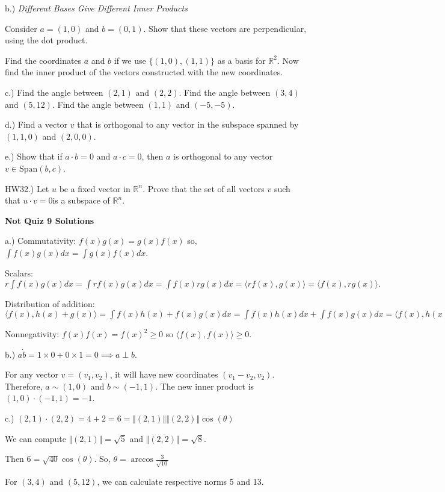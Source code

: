 \documentclass{article}
\begin{document}
b.) \emph{Different Bases Give Different Inner Products}

Consider $a=(1,0)$ and $b=(0,1)$. Show that these vectors are perpendicular, using the dot product. 


Find the coordinates $a$ and $b$ if we use $\{(1,0),(1,1)\}$ as a basis for $\mathbb{R}^2$. Now find the inner product of the vectors constructed with the new coordinates. 

c.) Find the angle between $(2,1)$ and $(2,2)$. Find the angle between $(3,4)$ and $(5,12)$. Find the angle between $(1,1)$ and $(-5,-5)$. 

d.) Find a vector $v$ that is orthogonal to any vector in the subspace spanned by $(1,1,0)$ and $(2,0,0)$.

e.) Show that if $a\cdot b=0$ and $a\cdot c=0$, then $a$ is orthogonal to any vector $v\in \text{Span}(b,c)$. 

HW32.) Let $u$ be a fixed vector in $\mathbb{R}^n$. Prove that the set of all vectors $v$ such that $u \cdot v =0$is a subspace of $\mathbb{R}^n$.

\pagebreak
\textbf{Not Quiz 9 Solutions}


a.) Commutativity: $f(x)g(x)=g(x)f(x)$ so, $\int f(x)g(x) dx = \int g(x)f(x) dx$.

Scalars: $r\int f(x)g(x)dx = \int rf(x)g(x)dx = \int f(x)rg(x) dx = \langle rf(x),g(x) \rangle = \langle f(x), rg(x)\rangle.$

Distribution of addition: $\langle f(x), h(x)+g(x)\rangle = \int f(x)h(x) + f(x)g(x)dx = \int f(x)h(x) dx + \int f(x)g(x) dx = \langle f(x), h(x)\rangle + \langle f(x), g(x)\rangle.$

Nonnegativity: $f(x)f(x)=f(x)^2 \geq 0 $ so $\langle f(x), f(x)\rangle \geq 0$.

\medskip

b.) $a\dot b = 1\times 0 + 0 \times 1= 0 \implies a\perp b$.

For any vector $v=(v_1, v_2)$, it will have new coordinates $(v_1-v_2, v_2)$. Therefore, $a \sim (1,0)$ and $b\sim (-1,1)$. The new inner product is $(1,0)\cdot (-1,1) = -1$. 

c.) $(2,1) \cdot (2,2) = 4 +2 = 6 =  \Vert (2,1) \Vert \Vert (2,2) \Vert \cos(\theta)$

We can compute $\Vert (2,1) \Vert  = \sqrt{5}$ and $\Vert (2,2) \Vert = \sqrt{8}$.

Then $6 = \sqrt{40} \cos (\theta)$. So, $\theta = \arccos \frac{3}{\sqrt{10}}$


For $(3,4)$ and $(5,12)$, we can calculate respective norms 5 and 13. 
\end{document}
